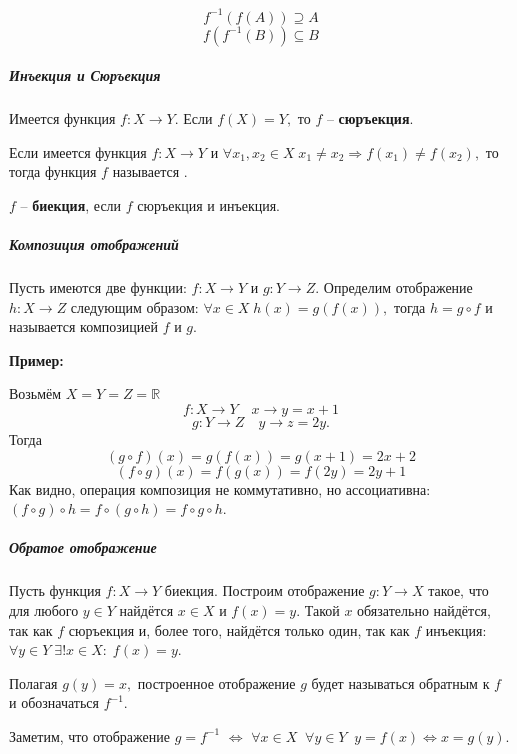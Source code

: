 \begin{Remark}
$$f^{-1}\left(f(A)\right)\supseteq  A$$
$$f\left(f^{-1}(B)\right) \subseteq B$$
\end{Remark}

\subparagraph{Инъекция и Сюръекция}
\begin{Definition}
Имеется функция $f:X \rightarrow Y.$ Если $f(X)=Y,$ то $f$ -- {\bf сюръекция}.
\end{Definition}
\begin{Definition}
Если имеется функция $f:X \rightarrow Y$ и $\forall x_1, x_2 \in X \; x_1 \neq x_2 \Rightarrow f(x_1)\neq f(x_2),$ то тогда функция $f$ называется {}.
\end{Definition}
\begin{Definition}
$f$ -- {\bf биекция}, если $f$ сюръекция и инъекция.
\end{Definition} 

\subparagraph{Композиция отображений}
Пусть имеются две функции: $f:X \rightarrow Y$ и $g:Y \rightarrow Z.$
Определим отображение $h:X \rightarrow Z$ следующим образом: $\forall x\in X \; h(x)=g(f(x)),$ тогда $h=g\circ f$ и называется композицией $f$ и $g.$

\newpage
\par\medskip \textbf{Пример:}\par
Возьмём $X=Y=Z=\mathbb{R}$ $$f:X\rightarrow Y \quad x\rightarrow y = x+1$$ $$g:Y\rightarrow Z \quad y\rightarrow z=2y.$$ Тогда $$(g\circ f)(x)=g(f(x))=g(x+1)=2x+2$$ $$(f\circ g)(x)=f(g(x))=f(2y)=2y+1$$
Как видно, операция композиция не коммутативно, но ассоциативна: $(f\circ g)\circ h = f\circ(g\circ h)=f\circ g\circ h.$

\subparagraph{Обратое отображение}
\begin{Definition}
Пусть функция $f:X\to Y$ биекция. Построим отображение $g:Y\to X$ такое, что для любого $y\in Y$ найдётся $x\in X$ и $f(x)=y.$ Такой $x$ обязательно найдётся, так как $f$ сюръекция и, более того, найдётся только один, так как $f$ инъекция: $\forall y\in Y \; \exists! x\in X: \; f(x)=y.$
\end{Definition}

Полагая $g(y)=x,$ построенное отображение $g$ будет называться обратным к $f$ и обозначаться $f^{-1}.$

Заметим, что отображение $g=f^{-1}$ $\Leftrightarrow$ $\forall x\in X \;\; \forall y\in Y \;\; y=f(x) \Leftrightarrow x=g(y).$\\

